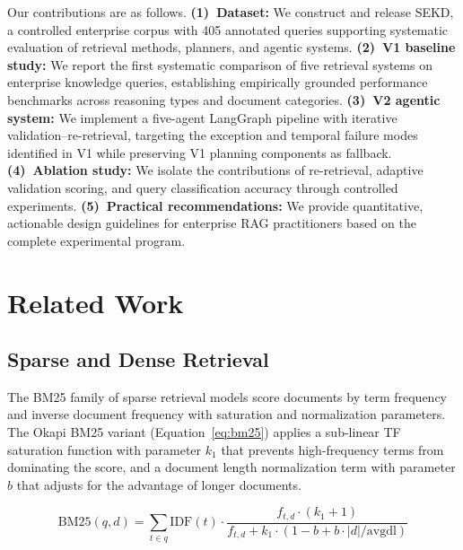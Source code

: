 \documentclass[11pt, a4paper]{article}
\begin{document}
Our contributions are as follows. \textbf{(1)~Dataset:} We construct and release SEKD, a controlled enterprise corpus with 405 annotated queries supporting systematic evaluation of retrieval methods, planners, and agentic systems. \textbf{(2)~V1 baseline study:} We report the first systematic comparison of five retrieval systems on enterprise knowledge queries, establishing empirically grounded performance benchmarks across reasoning types and document categories. \textbf{(3)~V2 agentic system:} We implement a five-agent LangGraph pipeline with iterative validation--re-retrieval, targeting the exception and temporal failure modes identified in V1 while preserving V1 planning components as fallback. \textbf{(4)~Ablation study:} We isolate the contributions of re-retrieval, adaptive validation scoring, and query classification accuracy through controlled experiments. \textbf{(5)~Practical recommendations:} We provide quantitative, actionable design guidelines for enterprise RAG practitioners based on the complete experimental program.

\section{Related Work}
\label{sec:related}

\subsection{Sparse and Dense Retrieval}

The BM25 \citep{robertson2009bm25,robertson1995okapi} family of sparse retrieval models score documents by term frequency and inverse document frequency with saturation and normalization parameters. The Okapi BM25 variant (Equation~\ref{eq:bm25}) applies a sub-linear TF saturation function with parameter $k_1$ that prevents high-frequency terms from dominating the score, and a document length normalization term with parameter $b$ that adjusts for the advantage of longer documents.

\begin{equation}
\text{BM25}(q,d) = \sum_{t \in q} \text{IDF}(t) \cdot \frac{f_{t,d} \cdot (k_1 + 1)}{f_{t,d} + k_1 \cdot (1 - b + b \cdot |d| / \text{avgdl})}
\label{eq:bm25}
\end{equation}
\end{document}
